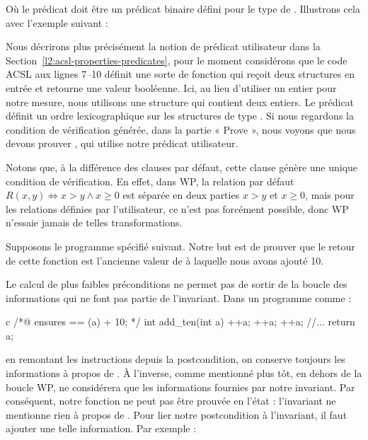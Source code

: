 Où le prédicat  doit être un prédicat binaire défini pour
le type de . Illustrons cela avec l'exemple suivant :




Nous décrirons plus précisément la notion de prédicat utilisateur dans la
Section~\ref{l2:acsl-properties-predicates}, pour le moment considérons que le
code ACSL aux lignes 7--10 définit une sorte de fonction qui reçoit deux
structures en entrée et retourne une valeur booléenne. Ici, au lieu d'utiliser
un entier pour notre mesure, nous utilisons une structure qui contient deux
entiers. Le prédicat  définit un ordre lexicographique sur
les structures de type . Si nous regardons la condition de
vérification générée, dans la partie « Prove », nous voyons que nous devons
prouver , qui utilise notre prédicat utilisateur.


Notons que, à la différence des clauses  par défaut,
cette clause génère une unique condition de vérification. En effet, dans WP,
la relation par défaut $R(x,y) \Leftrightarrow x > y \wedge x \geq 0$ est
séparée en deux parties $x > y$ et $x \geq 0$, mais pour les relations définies
par l'utilisateur, ce n'est pas forcément possible, donc WP n'essaie jamais de
telles transformations.




Supposons le programme spécifié suivant. Notre but est de prouver que le retour
de cette fonction est l'ancienne valeur de  à laquelle nous avons ajouté 10.






Le calcul de plus faibles préconditions ne permet pas de sortir de la boucle des
informations qui ne font pas partie de l'invariant. Dans un programme comme :
\begin{CodeBlock}{c}
/*@
    ensures \result == \old(a) + 10;
*/
int add_ten(int a){
    ++a;
    ++a;
    ++a;
    //...
    return a;
}
\end{CodeBlock}
en remontant les instructions depuis la postcondition, on conserve toujours les
informations à propos de . À l'inverse, comme mentionné plus tôt, en dehors
de la boucle WP, ne considérera que les informations fournies par notre
invariant. Par conséquent, notre fonction  ne peut pas être prouvée
en l'état : l'invariant ne mentionne rien à propos de . Pour lier notre
postcondition à l'invariant, il faut ajouter une telle information. Par
exemple :



